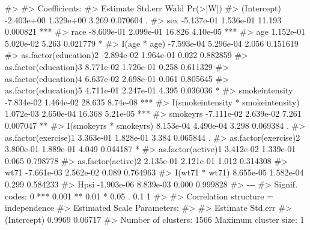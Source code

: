 \documentclass[
  10pt,
  a4paper,
]{book}
\newenvironment{Shaded}{\begin{snugshade}}{\end{snugshade}}
\newcommand{\CommentTok}[1]{\textcolor[rgb]{0.37,0.37,0.37}{#1}}
\begin{document}
\begin{Shaded}
\begin{Highlighting}[]
\CommentTok{\#\textgreater{} }
\CommentTok{\#\textgreater{}  Coefficients:}
\CommentTok{\#\textgreater{}                                      Estimate    Std.err   Wald Pr(\textgreater{}|W|)    }
\CommentTok{\#\textgreater{} (Intercept)                        {-}2.403e+00  1.329e+00  3.269 0.070604 .  }
\CommentTok{\#\textgreater{} sex                                {-}5.137e{-}01  1.536e{-}01 11.193 0.000821 ***}
\CommentTok{\#\textgreater{} race                               {-}8.609e{-}01  2.099e{-}01 16.826 4.10e{-}05 ***}
\CommentTok{\#\textgreater{} age                                 1.152e{-}01  5.020e{-}02  5.263 0.021779 *  }
\CommentTok{\#\textgreater{} I(age * age)                       {-}7.593e{-}04  5.296e{-}04  2.056 0.151619    }
\CommentTok{\#\textgreater{} as.factor(education)2              {-}2.894e{-}02  1.964e{-}01  0.022 0.882859    }
\CommentTok{\#\textgreater{} as.factor(education)3               8.771e{-}02  1.726e{-}01  0.258 0.611329    }
\CommentTok{\#\textgreater{} as.factor(education)4               6.637e{-}02  2.698e{-}01  0.061 0.805645    }
\CommentTok{\#\textgreater{} as.factor(education)5               4.711e{-}01  2.247e{-}01  4.395 0.036036 *  }
\CommentTok{\#\textgreater{} smokeintensity                     {-}7.834e{-}02  1.464e{-}02 28.635 8.74e{-}08 ***}
\CommentTok{\#\textgreater{} I(smokeintensity * smokeintensity)  1.072e{-}03  2.650e{-}04 16.368 5.21e{-}05 ***}
\CommentTok{\#\textgreater{} smokeyrs                           {-}7.111e{-}02  2.639e{-}02  7.261 0.007047 ** }
\CommentTok{\#\textgreater{} I(smokeyrs * smokeyrs)              8.153e{-}04  4.490e{-}04  3.298 0.069384 .  }
\CommentTok{\#\textgreater{} as.factor(exercise)1                3.363e{-}01  1.828e{-}01  3.384 0.065844 .  }
\CommentTok{\#\textgreater{} as.factor(exercise)2                3.800e{-}01  1.889e{-}01  4.049 0.044187 *  }
\CommentTok{\#\textgreater{} as.factor(active)1                  3.412e{-}02  1.339e{-}01  0.065 0.798778    }
\CommentTok{\#\textgreater{} as.factor(active)2                  2.135e{-}01  2.121e{-}01  1.012 0.314308    }
\CommentTok{\#\textgreater{} wt71                               {-}7.661e{-}03  2.562e{-}02  0.089 0.764963    }
\CommentTok{\#\textgreater{} I(wt71 * wt71)                      8.655e{-}05  1.582e{-}04  0.299 0.584233    }
\CommentTok{\#\textgreater{} Hpsi                               {-}1.903e{-}06  8.839e{-}03  0.000 0.999828    }
\CommentTok{\#\textgreater{} {-}{-}{-}}
\CommentTok{\#\textgreater{} Signif. codes:  0 \textquotesingle{}***\textquotesingle{} 0.001 \textquotesingle{}**\textquotesingle{} 0.01 \textquotesingle{}*\textquotesingle{} 0.05 \textquotesingle{}.\textquotesingle{} 0.1 \textquotesingle{} \textquotesingle{} 1}
\CommentTok{\#\textgreater{} }
\CommentTok{\#\textgreater{} Correlation structure = independence }
\CommentTok{\#\textgreater{} Estimated Scale Parameters:}
\CommentTok{\#\textgreater{} }
\CommentTok{\#\textgreater{}             Estimate Std.err}
\CommentTok{\#\textgreater{} (Intercept)   0.9969 0.06717}
\CommentTok{\#\textgreater{} Number of clusters:   1566  Maximum cluster size: 1}
\end{Highlighting}
\end{Shaded}
\end{document}
